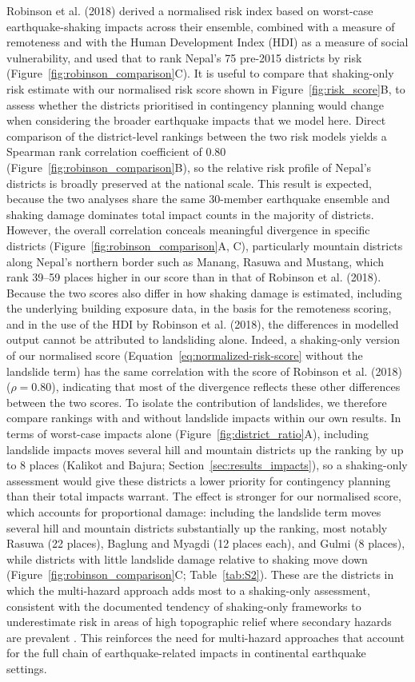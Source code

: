 \documentclass[preprint,12pt,authoryear]{elsarticle}
\begin{document}
Robinson et al. (2018) derived a normalised risk index based on worst-case earthquake-shaking impacts across their ensemble, combined with a measure of remoteness and with the Human Development Index (HDI) as a measure of social vulnerability, and used that to rank Nepal's 75 pre-2015 districts by risk (Figure~\ref{fig:robinson_comparison}C). It is useful to compare that shaking-only risk estimate with our normalised risk score shown in Figure~\ref{fig:risk_score}B, to assess whether the districts prioritised in contingency planning would change when considering the broader earthquake impacts that we model here. Direct comparison of the district-level rankings between the two risk models yields a Spearman rank correlation coefficient of 0.80 (Figure~\ref{fig:robinson_comparison}B), so the relative risk profile of Nepal's districts is broadly preserved at the national scale. This result is expected, because the two analyses share the same 30-member earthquake ensemble and shaking damage dominates total impact counts in the majority of districts. However, the overall correlation conceals meaningful divergence in specific districts (Figure~\ref{fig:robinson_comparison}A, C), particularly mountain districts along Nepal's northern border such as Manang, Rasuwa and Mustang, which rank 39--59 places higher in our score than in that of Robinson et al. (2018). Because the two scores also differ in how shaking damage is estimated, including the underlying building exposure data, in the basis for the remoteness scoring, and in the use of the HDI by Robinson et al. (2018), the differences in modelled output cannot be attributed to landsliding alone. Indeed, a shaking-only version of our normalised score (Equation~\ref{eq:normalized-risk-score} without the landslide term) has the same correlation with the score of Robinson et al. (2018) ($\rho = 0.80$), indicating that most of the divergence reflects these other differences between the two scores. To isolate the contribution of landslides, we therefore compare rankings with and without landslide impacts within our own results. In terms of worst-case impacts alone (Figure~\ref{fig:district_ratio}A), including landslide impacts moves several hill and mountain districts up the ranking by up to 8 places (Kalikot and Bajura; Section~\ref{sec:results_impacts}), so a shaking-only assessment would give these districts a lower priority for contingency planning than their total impacts warrant. The effect is stronger for our normalised score, which accounts for proportional damage: including the landslide term moves several hill and mountain districts substantially up the ranking, most notably Rasuwa (22 places), Baglung and Myagdi (12 places each), and Gulmi (8 places), while districts with little landslide damage relative to shaking move down (Figure~\ref{fig:robinson_comparison}C; Table~\ref{tab:S2}). These are the districts in which the multi-hazard approach adds most to a shaking-only assessment, consistent with the documented tendency of shaking-only frameworks to underestimate risk in areas of high topographic relief where secondary hazards are prevalent \citep{Budimir2014}. This reinforces the need for multi-hazard approaches that account for the full chain of earthquake-related impacts in continental earthquake settings.
\end{document}
